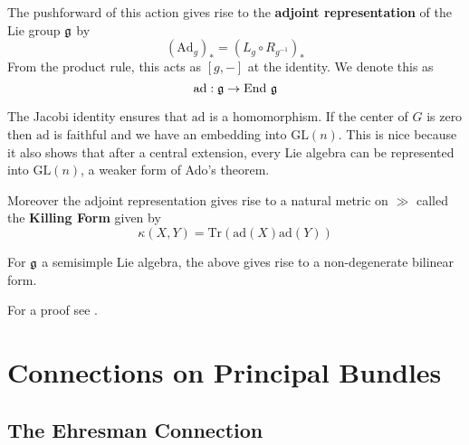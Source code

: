		\begin{defn}
			The pushforward of this action gives rise to the \textbf{adjoint representation} of the Lie group $\frak g$ by
			\begin{equation}
				(\mathrm{Ad}_g)_* = (L_g \circ R_{g^{-1}})_* 
			\end{equation}
			From the product rule, this acts as $[g, -]$ at the identity. We denote this as
			\begin{equation}
				\mathrm{ad}: \frak g \rightarrow \mathrm{End}~ \frak g
			\end{equation}
		\end{defn}
		
		The Jacobi identity ensures that $\mathrm{ad}$ is a homomorphism. If the center of $G$ is zero then $\mathrm{ad}$ is faithful and we have an embedding into $\mathrm{GL}(n)$. This is nice because it also shows that after a central extension, every Lie algebra can be represented into $\mathrm{GL}(n)$, a weaker form of Ado's theorem.
		
		Moreover the adjoint representation gives rise to a natural metric on $\gg$ called the \textbf{Killing Form} given by
		\begin{equation}
			\kappa (X, Y) = \mathrm{Tr}(\mathrm{ad}(X) \mathrm{ad}(Y))
		\end{equation}
		
		\begin{prop}
			For $\frak g$ a semisimple Lie algebra, the above gives rise to a non-degenerate bilinear form. 
		\end{prop}
		For a proof see \cite{humphreys2012}.
		
		\section{Connections on Principal Bundles}
		
		\subsection{The Ehresman Connection}
		
